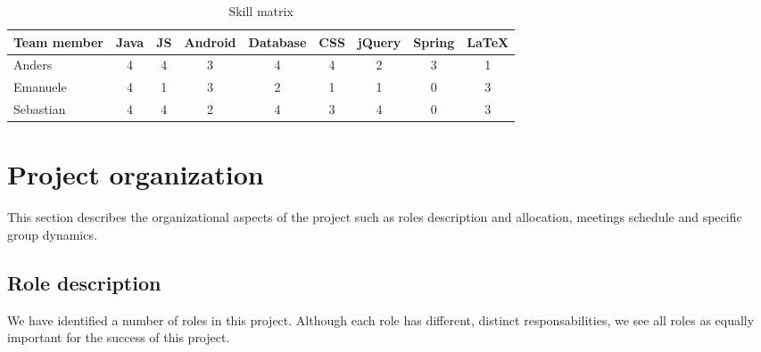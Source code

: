\begin{table}[h]
\begin{center}
\begin{tabular}{ | l | c | c | c | c | c | c | c | c | }
  \hline
  Team member & Java & JS & Android & Database & CSS & jQuery & Spring & LaTeX \\
  \hline\noalign{\smallskip}\hline
  Anders & 4 & 4 & 3 & 4 & 4 & 2 & 3 & 1 \\
  Emanuele & 4 & 1 & 3 & 2 & 1 & 1 & 0 & 3 \\
  Sebastian & 4 & 4 & 2 & 4 & 3 & 4 & 0 & 3 \\
  \hline
\end{tabular}
\end{center}
\caption{Skill matrix}
\label{table:skillmatrix}
\end{table}

\newpage
\section{Project organization}
\label{section:organization}

This section describes the organizational aspects of the project such as roles description and allocation,
meetings schedule and
specific group dynamics.

\subsection{Role description}
We have identified a number of roles in this project. Although each role has different, distinct responsabilities,
we see all roles as equally important for the success of this project.

